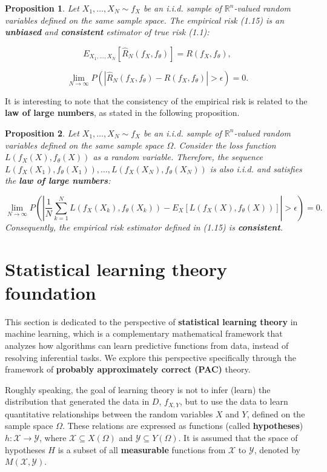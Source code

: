\documentclass{report}
\newtheorem{proposition}{Proposition}[chapter]
\begin{document}
\begin{proposition}
Let $X_1,\dots,X_N \sim f_X$ be an i.i.d. sample of $\mathbb{R}^n$-valued random variables defined on the same sample space. The empirical risk (1.15) is an \textbf{unbiased} and \textbf{consistent} estimator of true risk (1.1):

\begin{equation}
E_{X_1,...,X_N}[\hat{R}_N(f_X,f_\theta)] = R(f_X,f_\theta),
\end{equation}

\begin{equation}
\lim_{N\to \infty}P(|\hat{R}_N(f_X,f_\theta)-R(f_X,f_\theta)| > \epsilon) = 0.
\end{equation}
\end{proposition}
It is interesting to note that the consistency of the empirical risk is related to the \textbf{law of large numbers}, as stated in the following proposition.

\begin{proposition}
Let $X_1,\dots,X_N \sim f_X$ be an i.i.d. sample of $\mathbb{R}^n$-valued random variables defined on the same sample space $\Omega$. Consider the loss function $L(f_X(X), f_\theta(X))$ as a random variable. Therefore, the sequence $L(f_X(X_1),f_\theta(X_1)),\dots,L(f_X(X_N),f_\theta(X_N))$ is also i.i.d. and satisfies the \textbf{law of large numbers}:

\begin{equation}
\lim_{N\to \infty}P\left(\left|\frac{1}{N}\sum_{k=1}^NL(f_X(X_k),f_\theta(X_k)) - E_{X}[L(f_X(X),f_\theta(X))]\right| > \epsilon\right) = 0.
\end{equation}
Consequently, the empirical risk estimator defined in (1.15) is \textbf{consistent}.
\end{proposition}

\section{Statistical learning theory foundation}
This section is dedicated to the perspective of \textbf{statistical learning theory} in machine learning, which is a complementary mathematical framework that analyzes how algorithms can learn predictive functions from data, instead of resolving inferential tasks. We explore this perspective specifically through the framework of \textbf{probably approximately correct (PAC)} theory.

Roughly speaking, the goal of learning theory is not to infer (learn) the distribution that generated the data in $D$, $f_{X,Y}$, but to use the data to learn quantitative relationships between the random variables $X$ and $Y$, defined on the sample space $\Omega$. These relations are expressed as functions (called \textbf{hypotheses}) $h : \mathcal{X} \to \mathcal{Y}$, where $\mathcal{X} \subseteq X(\Omega)$ and $\mathcal{Y} \subseteq Y(\Omega)$. It is assumed that the space of hypotheses $H$ is a subset of all \textbf{measurable} functions from $\mathcal{X}$ to $\mathcal{Y}$, denoted by $M(\mathcal{X}, \mathcal{Y})$.
\end{document}
